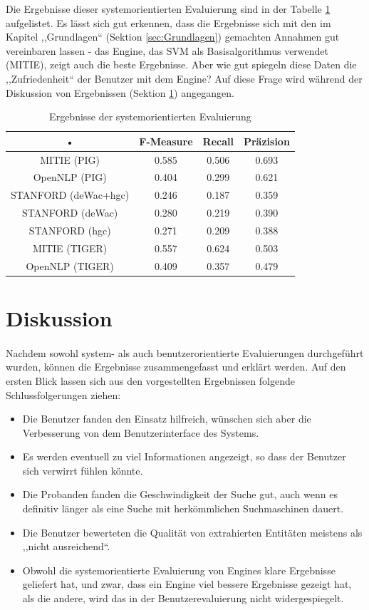 Die Ergebnisse dieser systemorientierten Evaluierung sind in der Tabelle \ref{tab:AUTOEVAL} aufgelistet. Es lässt sich gut erkennen, dass die Ergebnisse sich mit den im Kapitel ,,Grundlagen`` (Sektion \ref{sec:Grundlagen}) gemachten Annahmen gut vereinbaren lassen - das Engine, das SVM als Basisalgorithmus verwendet (MITIE), zeigt auch die beste Ergebnisse. Aber wie gut spiegeln diese Daten die ,,Zufriedenheit`` der Benutzer mit dem Engine? Auf diese Frage wird während der Diskussion von Ergebnissen (Sektion \ref{sec:diskussion}) angegangen.

\begin{table}
\begin{tabular}{|c|c|c|c|}
\hline 
• & F-Measure & Recall & Präzision \\ 
\hline 
MITIE (PIG) & 0.585 & 0.506 & 0.693 \\
\hline
OpenNLP (PIG) & 0.404 & 0.299 & 0.621 \\
\hline
STANFORD (deWac+hgc) & 0.246 & 0.187 & 0.359 \\
\hline
STANFORD (deWac) & 0.280 & 0.219 & 0.390 \\
\hline
STANFORD (hgc) & 0.271 & 0.209 & 0.388 \\
\hline 
MITIE (TIGER) & 0.557 & 0.624 & 0.503 \\
\hline
OpenNLP (TIGER) & 0.409 & 0.357 & 0.479 \\
\hline
\end{tabular} 
\caption{Ergebnisse der systemorientierten Evaluierung}
\label{tab:AUTOEVAL}
\end{table}

\section{Diskussion} \label{sec:diskussion}
\paragraph{}
Nachdem sowohl system- als auch benutzerorientierte Evaluierungen durchgeführt wurden, können die Ergebnisse zusammengefasst und erklärt werden. Auf den ersten Blick lassen sich aus den vorgestellten Ergebnissen folgende Schlussfolgerungen ziehen:
\begin{itemize}
\item Die Benutzer fanden den Einsatz hilfreich, wünschen sich aber die Verbesserung von dem Benutzerinterface des Systems.
\item Es werden eventuell zu viel Informationen angezeigt, so dass der Benutzer sich verwirrt fühlen könnte.
\item Die Probanden fanden die Geschwindigkeit der Suche gut, auch wenn es definitiv länger als eine Suche mit herkömmlichen Suchmaschinen dauert. 
\item Die Benutzer bewerteten die Qualität von extrahierten Entitäten meistens als ,,nicht ausreichend``.
\item Obwohl die systemorientierte Evaluierung von Engines klare Ergebnisse geliefert hat, und zwar, dass ein Engine viel bessere Ergebnisse gezeigt hat, als die andere, wird das in der Benutzerevaluierung nicht widergespiegelt.
\end{itemize}


